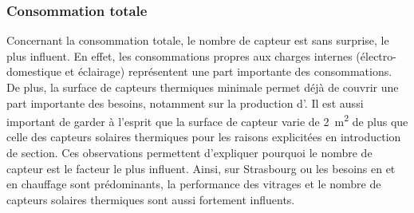 \subsubsection{Consommation totale} %
\label{ssub:consommation_totale}
Concernant la consommation totale, le nombre de capteur  est sans surprise, le
plus influent. En effet, les consommations propres aux charges internes (électro-domestique
et éclairage) représentent une part importante des consommations. De plus, la
surface de capteurs thermiques minimale permet déjà de couvrir une part importante des
besoins, notamment sur la production d’. Il est aussi important de garder à
l’esprit que la surface de capteur  varie de \SI{2}{\metre\squared} de plus que
celle des capteurs solaires thermiques pour les raisons explicitées en introduction de
section. Ces observations permettent d’expliquer pourquoi le nombre de capteur 
est le facteur le plus influent. Ainsi, sur Strasbourg ou les besoins en  et
en chauffage sont prédominants, la performance des vitrages et le nombre de capteurs
solaires thermiques sont aussi fortement influents.


